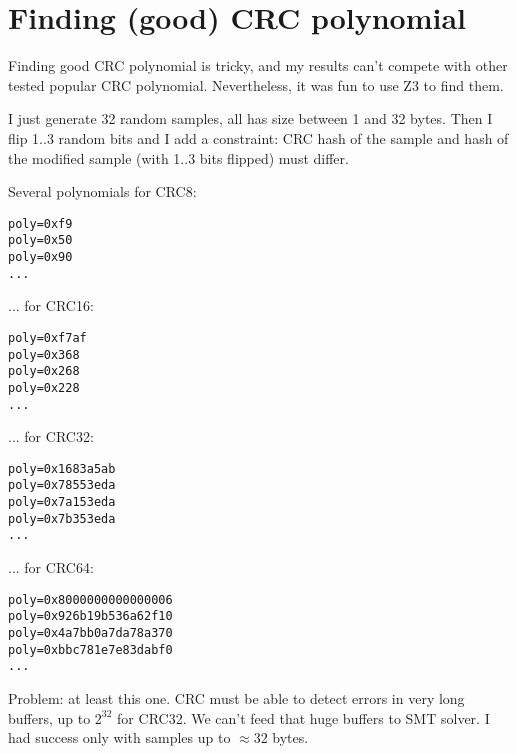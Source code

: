 \section{Finding (good) CRC polynomial}

Finding good CRC polynomial is tricky, and my results can't compete with other tested popular CRC polynomial.
Nevertheless, it was fun to use Z3 to find them.

I just generate 32 random samples, all has size between 1 and 32 bytes.
Then I flip 1..3 random bits and I add a constraint: CRC hash of the sample and hash of the modified sample (with 1..3 bits flipped) must differ.



Several polynomials for CRC8:

\begin{lstlisting}
poly=0xf9
poly=0x50
poly=0x90
...
\end{lstlisting}

... for CRC16:

\begin{lstlisting}
poly=0xf7af
poly=0x368
poly=0x268
poly=0x228
...
\end{lstlisting}

... for CRC32:

\begin{lstlisting}
poly=0x1683a5ab
poly=0x78553eda
poly=0x7a153eda
poly=0x7b353eda
...
\end{lstlisting}

... for CRC64:

\begin{lstlisting}
poly=0x8000000000000006
poly=0x926b19b536a62f10
poly=0x4a7bb0a7da78a370
poly=0xbbc781e7e83dabf0
...
\end{lstlisting}

Problem: at least this one. CRC must be able to detect errors in very long buffers, up to $2^{32}$ for CRC32. We can't feed that huge buffers to SMT solver.
I had success only with samples up to $\approx 32$ bytes.

